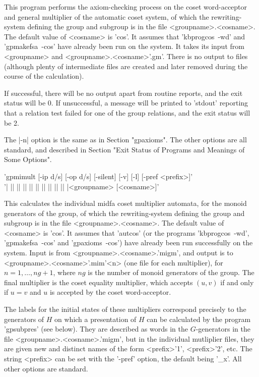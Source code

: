 This program performs the axiom-checking process on the coset word-acceptor and
general multiplier of the automatic coset system, of which the
rewriting-system defining the group and subgroup is in the file
<groupname>.<cosname>. The default value of <cosname> is 'cos'.
It assumes that 'kbprogcos\ -wd' and 'gpmakefsa\ -cos' have already been run
on the system.
It takes its input from <groupname> and <groupname>.<cosname>'.gm'. 
There is no output to files (although plenty of intermediate files are
created and later removed during the course of the calculation).

If successful, there will be no output apart from routine reports, and the exit
status will be 0. If unsuccessful, a message will be printed to 'stdout'
reporting that a relation test failed for one of the group relations, and
the exit status will be 2.

The |-n| option is the same as in Section "gpaxioms".
The other options are all standard, and described in Section 
"Exit Status of Programs and Meanings of Some Options".

'gpmimult [-ip d/s] [-op d/s] [-silent] [-v] [-l] [-pref <prefix>]'\\
'| || || || || || || || || || |<groupname> [<cosname>]'

This calculates the individual midfa coset multiplier automata, for the monoid
generators of the group, of which the rewriting-system
defining the group and subgroup is in the file <groupname>.<cosname>.
The default value of <cosname> is 'cos'.
It assumes that 'autcos' (or the programs 'kbprogcos\ -wd', 'gpmakefsa\ -cos'
and 'gpaxioms\ -cos') have already been run successfully on the system.
Input is from <groupname>.<cosname>.'migm', and output is to
<groupname>.<cosname>'.mim'<n>
(one file for each multiplier), for $n = 1, \ldots , ng+1$, where $ng$ is
the number of monoid generators of the group. The final multiplier is
the coset equality multiplier, which accepts $(u,v)$ if and only if
$u = v$ and $u$ is accepted by the coset word-acceptor.

The labels for the initial states of these multipliers correspond
precisely to the generators of $H$ on which a presentation of $H$
can be calculated by the program 'gpsubpres' (see below). They are
described as words in the $G$-generators in the file
<groupname>.<cosname>.'migm', but in the individual mutliplier
files, they are given new and distinct names of the form
<prefix>'1', <prefix>'2', etc.
The string <prefix> can be set with the '-pref' option, the
default being '\_x'. All other options are standard.

